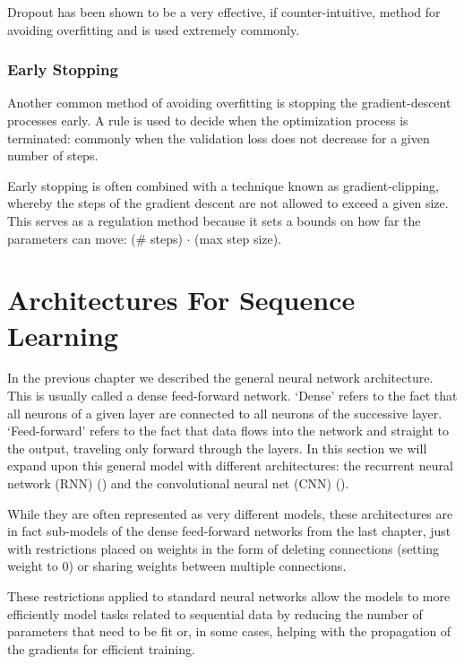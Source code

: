 \documentclass[]{book}
\theoremstyle{definition}
\theoremstyle{definition}
\theoremstyle{definition}
\theoremstyle{remark}
\begin{document}
Dropout has been shown to be a very effective, if counter-intuitive,
method for avoiding overfitting and is used extremely commonly.

\subsection{Early Stopping}\label{early-stopping}

Another common method of avoiding overfitting is stopping the
gradient-descent processes early. A rule is used to decide when the
optimization process is terminated: commonly when the validation loss
does not decrease for a given number of steps.

Early stopping is often combined with a technique known as
gradient-clipping, whereby the steps of the gradient descent are not
allowed to exceed a given size. This serves as a regulation method
because it sets a bounds on how far the parameters can move: (\# steps)
\(\cdot\) (max step size).

\chapter{Architectures For Sequence Learning}\label{architectures}

In the previous chapter we described the general neural network
architecture. This is usually called a dense feed-forward network.
`Dense' refers to the fact that all neurons of a given layer are
connected to all neurons of the successive layer. `Feed-forward' refers
to the fact that data flows into the network and straight to the output,
traveling only forward through the layers. In this section we will
expand upon this general model with different architectures: the
recurrent neural network (RNN) (\citet{rnn_intro}) and the convolutional
neural net (CNN) (\citet{cnn_intro}).

While they are often represented as very different models, these
architectures are in fact sub-models of the dense feed-forward networks
from the last chapter, just with restrictions placed on weights in the
form of deleting connections (setting weight to 0) or sharing weights
between multiple connections.

These restrictions applied to standard neural networks allow the models
to more efficiently model tasks related to sequential data by reducing
the number of parameters that need to be fit or, in some cases, helping
with the propagation of the gradients for efficient training.
\end{document}
